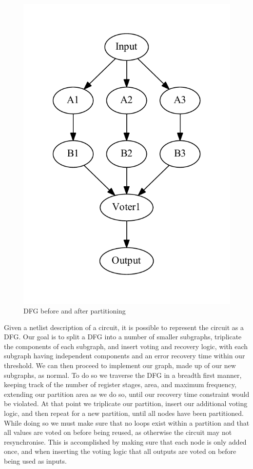 \documentclass[12pt,final,oneside]{memoir} %
\begin{document}
\begin{figure}
\begin{center}
        \includegraphics[height=0.2\textheight]{images/TMR-post.pdf}
        \caption{\ac{DFG} before and after partitioning}
        \label{TMRFigure}
    \end{center}
\end{figure}
Given a netlist description of a circuit, it is possible to represent the circuit as a \ac{DFG}\cite{FPGAArch}. Our goal is to split a \ac{DFG} into a number of smaller subgraphs, triplicate the components of each subgraph, and insert voting and recovery logic, with each subgraph having independent components and an error recovery time within our threshold. We can then proceed to implement our graph, made up of our new subgraphs, as normal.
To do so we traverse the \ac{DFG} in a breadth first manner, keeping track of the number of register stages, area, and maximum frequency, extending our partition area as we do so, until our recovery time constraint would be violated. At that point we triplicate our partition, insert our additional voting logic, and then repeat for a new partition, until all nodes have been partitioned.  While doing so we must make sure that no loops exist within a partition and that all values are voted on before being reused, as otherwise the circuit may not resynchronise. This is accomplished by making sure that each node is only added once, and when inserting the voting logic that all outputs are voted on before being used as inputs.
\end{document}
